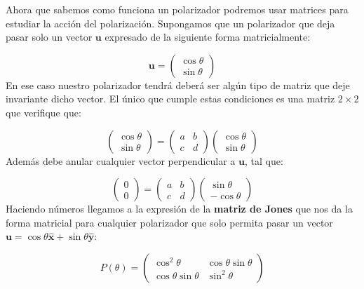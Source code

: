 \documentclass[12pt]{article}
\newcommand{\un}{\mathbf{u}}
\newcommand{\hnx}{\hat{\mathbf{x}}}
\newcommand{\hny}{\hat{\mathbf{y}}}
\numberwithin{equation}{section}
\numberwithin{figure}{section}
\begin{document}
Ahora que sabemos como funciona un polarizador podremos usar matrices para estudiar la acción del polarización. Supongamos que un polarizador que deja pasar solo un vector $\un$ expresado de la siguiente forma matricialmente:

\begin{equation}
\un = \begin{pmatrix}
\cos \theta \\
\sin \theta 
\end{pmatrix}
\end{equation}
En ese caso nuestro polarizador tendrá deberá ser algún tipo de matriz que deje invariante dicho vector. El único que cumple estas condiciones es una matriz $2 \times 2$ que verifique que:

\begin{equation}
\begin{pmatrix}
\cos \theta \\
\sin \theta
\end{pmatrix} = \begin{pmatrix}
a & b \\ 
c & d 
\end{pmatrix}
\begin{pmatrix}
\cos \theta \\
\sin \theta
\end{pmatrix}
\end{equation}
Además debe anular cualquier vector perpendicular a $\un$, tal que:

\begin{equation}
\begin{pmatrix}
0 \\
0 
\end{pmatrix} = \begin{pmatrix}
a & b \\ 
c & d 
\end{pmatrix}
\begin{pmatrix}
\sin \theta \\
- \cos \theta
\end{pmatrix}
\end{equation}
Haciendo números llegamos a la expresión de la \textbf{matriz de Jones} que nos da la forma matricial para cualquier polarizador que solo permita pasar un vector $\un = \cos \theta \hnx + \sin \theta \hny$:

\begin{equation}
P(\theta) = \begin{pmatrix}
\cos^2 \theta & \cos \theta \sin \theta \\
\cos \theta \sin \theta & \sin^2 \theta
\end{pmatrix}
\end{equation}
\end{document}
